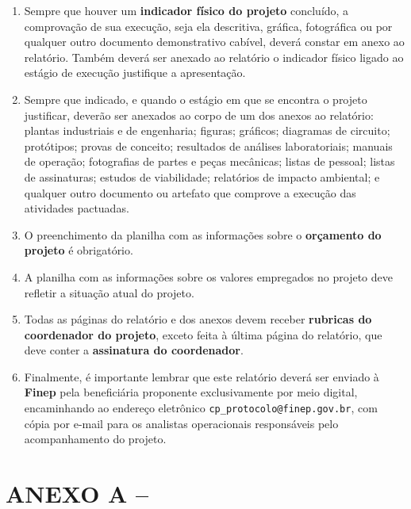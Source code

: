 \documentclass[a4paper,12pt]{article}
\begin{document}
\begin{mdframed}[linecolor=black,linewidth=1pt,backgroundcolor=gray!40]
\begin{enumerate}[label=14.\arabic*.,leftmargin=1cm]
    \item Sempre que houver um \textbf{indicador físico do projeto} concluído, a comprovação de sua execução, seja ela descritiva, gráfica, fotográfica ou por qualquer outro documento demonstrativo cabível, deverá constar em anexo ao relatório. Também deverá ser anexado ao relatório o indicador físico ligado ao estágio de execução justifique a apresentação.
    \item Sempre que indicado, e quando o estágio em que se encontra o projeto justificar, deverão ser anexados ao corpo de um dos anexos ao relatório: plantas industriais e de engenharia; figuras; gráficos; diagramas de circuito; protótipos; provas de conceito; resultados de análises laboratoriais; manuais de operação; fotografias de partes e peças mecânicas; listas de pessoal; listas de assinaturas; estudos de viabilidade; relatórios de impacto ambiental; e qualquer outro documento ou artefato que comprove a execução das atividades pactuadas.
    \item O preenchimento da planilha com as informações sobre o \textbf{orçamento do projeto} é obrigatório.
    \item A planilha com as informações sobre os valores empregados no projeto deve reﬂetir a situação atual do projeto.
    \item Todas as páginas do relatório e dos anexos devem receber \textbf{rubricas do coordenador do projeto}, exceto feita à última página do relatório, que deve conter a \textbf{assinatura do coordenador}.
    \item Finalmente, é importante lembrar que este relatório deverá ser enviado à \textbf{Finep} pela beneficiária proponente exclusivamente por meio digital, encaminhando ao endereço eletrônico \texttt{cp\_protocolo@finep.gov.br}, com cópia por e-mail para os analistas operacionais responsáveis pelo acompanhamento do projeto.
\end{enumerate}
\end{mdframed}
\newpage

\section[\texorpdfstring{ANEXO A – [preencher com o texto descrevendo o indicador físico da atividade 1.1]}{ANEXO A – [preencher com o texto descrevendo o indicador físico da atividade 1.1]}]{ANEXO A – \color{blue}{[preencher com o texto descrevendo o indicador físico da atividade 1.1]}}
\end{document}
